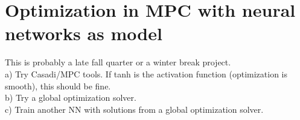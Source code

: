 \documentclass{article}
\begin{document}
\section{Optimization in MPC with neural networks as model}
This is probably a late fall quarter or a winter break project. \\
a) Try Casadi/MPC tools. 
If tanh is the activation function (optimization is smooth),
this should be fine. \\
b) Try a global optimization solver. \\
c) Train another NN with solutions from a global optimization solver.
\end{document}
